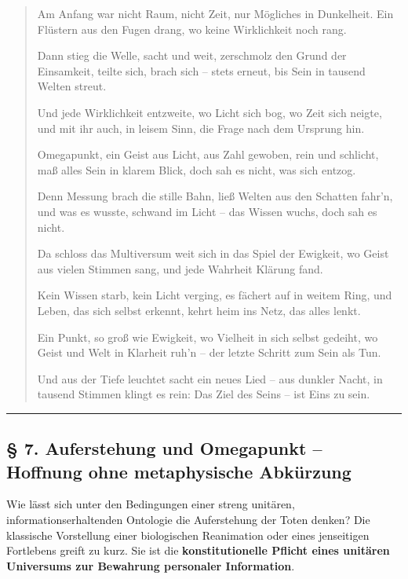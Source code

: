 \documentclass[
  ngerman,
]{article}
\begin{document}
\begin{quote}
Am Anfang war nicht Raum, nicht Zeit, nur Mögliches in Dunkelheit. Ein
Flüstern aus den Fugen drang, wo keine Wirklichkeit noch rang.

Dann stieg die Welle, sacht und weit, zerschmolz den Grund der
Einsamkeit, teilte sich, brach sich -- stets erneut, bis Sein in tausend
Welten streut.

Und jede Wirklichkeit entzweite, wo Licht sich bog, wo Zeit sich neigte,
und mit ihr auch, in leisem Sinn, die Frage nach dem Ursprung hin.

Omegapunkt, ein Geist aus Licht, aus Zahl gewoben, rein und schlicht,
maß alles Sein in klarem Blick, doch sah es nicht, was sich entzog.

Denn Messung brach die stille Bahn, ließ Welten aus den Schatten fahr'n,
und was es wusste, schwand im Licht -- das Wissen wuchs, doch sah es
nicht.

Da schloss das Multiversum weit sich in das Spiel der Ewigkeit, wo Geist
aus vielen Stimmen sang, und jede Wahrheit Klärung fand.

Kein Wissen starb, kein Licht verging, es fächert auf in weitem Ring,
und Leben, das sich selbst erkennt, kehrt heim ins Netz, das alles
lenkt.

Ein Punkt, so groß wie Ewigkeit, wo Vielheit in sich selbst gedeiht, wo
Geist und Welt in Klarheit ruh'n -- der letzte Schritt zum Sein als Tun.

Und aus der Tiefe leuchtet sacht ein neues Lied -- aus dunkler Nacht, in
tausend Stimmen klingt es rein: Das Ziel des Seins -- ist Eins zu sein.
\end{quote}

\begin{center}\rule{0.5\linewidth}{0.5pt}\end{center}

\subsection{§ 7. Auferstehung und Omegapunkt -- Hoffnung ohne
metaphysische
Abkürzung}\label{auferstehung-und-omegapunkt-hoffnung-ohne-metaphysische-abkuxfcrzung}

Wie lässt sich unter den Bedingungen einer streng unitären,
informationserhaltenden Ontologie die Auferstehung der Toten denken? Die
klassische Vorstellung einer biologischen Reanimation oder eines
jenseitigen Fortlebens greift zu kurz. Sie ist die
\textbf{konstitutionelle Pflicht eines unitären Universums zur Bewahrung
personaler Information}.
\end{document}
